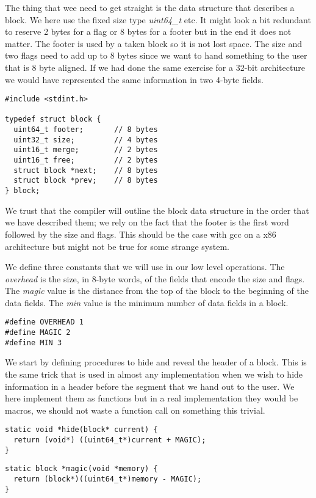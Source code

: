 \documentclass[a4paper,11pt]{article}
\begin{document}
 The thing that wee need to get straight is the data structure that
 describes a block. We here use the fixed size type {\em uint64\_t}
 etc. It might look a bit redundant to reserve 2 bytes for a flag or 8
 bytes for a footer but in the end it does not matter. The footer is
 used by a taken block so it is not lost space. The size and two
 flags need to add up to 8 bytes since we want to hand something to
 the user that is 8 byte aligned. If we had done the same exercise for
 a 32-bit architecture we would have represented the same information
 in two 4-byte fields.
 
 \begin{lstlisting}
#include <stdint.h>
   
typedef struct block {
  uint64_t footer;       // 8 bytes
  uint32_t size;         // 4 bytes
  uint16_t merge;        // 2 bytes
  uint16_t free;         // 2 bytes
  struct block *next;    // 8 bytes
  struct block *prev;    // 8 bytes
} block;
 \end{lstlisting}

 We trust that the compiler will outline the block data structure in
 the order that we have described them; we rely on the fact that the
 footer is the first word followed by the size and flags. This should
 be the case with gcc on a x86 architecture but might not be true for
 some strange system.

 We define three constants that we will use in our low level
 operations. The {\em overhead} is the size, in 8-byte words, of the
 fields that encode the size and flags. The {\em magic}
 value is the distance from the top of the block to the beginning of
 the data fields. The {\em min} value is the minimum number of data
 fields in a block.
 
 \begin{lstlisting}
#define OVERHEAD 1    
#define MAGIC 2       
#define MIN 3         
 \end{lstlisting}

 We start by defining procedures to hide and reveal the header of a
 block. This is the same trick that is used in almost any
 implementation when we wish to hide information in a header before the
 segment that we hand out to the user. We here implement them as
 functions but in a real implementation they would be macros, we should
 not waste a function call on something this trivial.

 \begin{lstlisting}
static void *hide(block* current) {
  return (void*) ((uint64_t*)current + MAGIC);
}
 \end{lstlisting}
 \begin{lstlisting}
static block *magic(void *memory) {
  return (block*)((uint64_t*)memory - MAGIC);
}
 \end{lstlisting}
\end{document}
